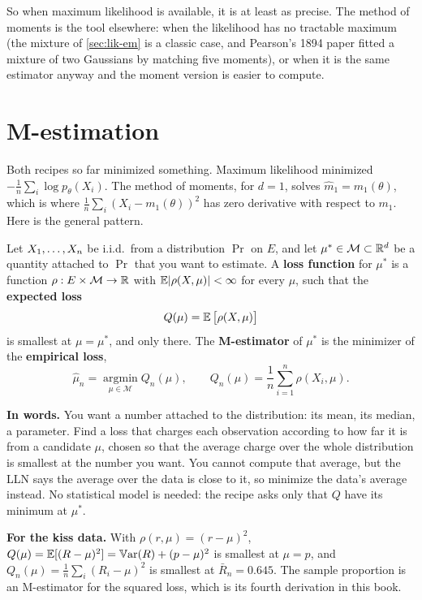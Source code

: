 So when maximum likelihood is available, it is at least as precise.
The method of moments is the tool elsewhere: when the likelihood has no tractable maximum (the mixture of \cref{sec:lik-em} is a classic case, and Pearson's 1894 paper fitted a mixture of two Gaussians by matching five moments), or when it is the same estimator anyway and the moment version is easier to compute.

\section{M-estimation}
\label{sec:mest}

Both recipes so far minimized something.
Maximum likelihood minimized $-\frac1n\sum_i\log p_\theta(X_i)$.
The method of moments, for $d = 1$, solves $\hat{m}_1 = m_1(\theta)$, which is where $\frac1n\sum_i(X_i - m_1(\theta))^2$ has zero derivative with respect to $m_1$.
Here is the general pattern.

\begin{definition}[M-estimator]
\label{def:mest}
Let $X_1, \ldots, X_n$ be i.i.d.\ from a distribution $\Pr$ on $E$, and let $\mu^* \in \mathcal{M} \subset \mathbb{R}^d$ be a quantity attached to $\Pr$ that you want to estimate.
A \textbf{loss function} for $\mu^*$ is a function $\rho: E \times \mathcal{M} \to \mathbb{R}$ with $\operatorname*{\mathbb{E}}\lvert\rho(X, \mu)\rvert < \infty$ for every $\mu$, such that the \textbf{expected loss}
\[
Q(\mu) = \operatorname*{\mathbb{E}}\big[\rho(X, \mu)\big]
\]
is smallest at $\mu = \mu^*$, and only there.
The \textbf{M-estimator} of $\mu^*$ is the minimizer of the \textbf{empirical loss},
\[
\hat{\mu}_n = \operatorname*{argmin}_{\mu \in \mathcal{M}} Q_n(\mu), \qquad Q_n(\mu) = \frac1n\sum_{i=1}^n \rho(X_i, \mu).
\]
\end{definition}

\begin{inwords}
\textbf{In words.} You want a number attached to the distribution: its mean, its median, a parameter. Find a loss that charges each observation according to how far it is from a candidate $\mu$, chosen so that the average charge over the whole distribution is smallest at the number you want. You cannot compute that average, but the LLN says the average over the data is close to it, so minimize the data's average instead. No statistical model is needed: the recipe asks only that $Q$ have its minimum at $\mu^*$.
\par\smallskip
\textbf{For the kiss data.} With $\rho(r, \mu) = (r - \mu)^2$, $Q(\mu) = \operatorname*{\mathbb{E}}[(R - \mu)^2] = \operatorname*{\mathbb{V}\text{ar}}(R) + (p - \mu)^2$ is smallest at $\mu = p$, and $Q_n(\mu) = \frac1n\sum_i(R_i - \mu)^2$ is smallest at $\bar{R}_n = 0.645$. The sample proportion is an M-estimator for the squared loss, which is its fourth derivation in this book.
\end{inwords}


